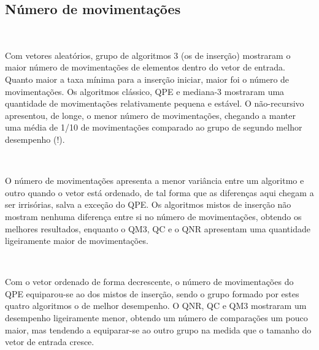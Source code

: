 \documentclass[11pt]{article}
\begin{document}
    \subsection{Número de
movimentações}\label{nuxfamero-de-movimentauxe7uxf5es}

    \begin{center}
    \end{center}
    { \hspace*{\fill} \\}
    
    Com vetores aleatórios, grupo de algoritmos 3 (os de inserção) mostraram
o maior número de movimentações de elementos dentro do vetor de entrada.
Quanto maior a taxa mínima para a inserção iniciar, maior foi o número
de movimentações. Os algoritmos clássico, QPE e mediana-3 mostraram uma
quantidade de movimentações relativamente pequena e estável. O
não-recursivo apresentou, de longe, o menor número de movimentações,
chegando a manter uma média de 1/10 de movimentações comparado ao grupo
de segundo melhor desempenho (!).

    \begin{center}
    \end{center}
    { \hspace*{\fill} \\}
    
    O número de movimentações apresenta a menor variância entre um algoritmo
e outro quando o vetor está ordenado, de tal forma que as diferenças
aqui chegam a ser irrisórias, salva a exceção do QPE. Os algoritmos
mistos de inserção não mostram nenhuma diferença entre si no número de
movimentações, obtendo os melhores resultados, enquanto o QM3, QC e o
QNR apresentam uma quantidade ligeiramente maior de movimentações.

    \begin{center}
    \end{center}
    { \hspace*{\fill} \\}
    
    Com o vetor ordenado de forma decrescente, o número de movimentações do
QPE equiparou-se ao dos mistos de inserção, sendo o grupo formado por
estes quatro algoritmos o de melhor desempenho. O QNR, QC e QM3
mostraram um desempenho ligeiramente menor, obtendo um número de
comparações um pouco maior, mas tendendo a equiparar-se ao outro grupo
na medida que o tamanho do vetor de entrada cresce.
\end{document}
